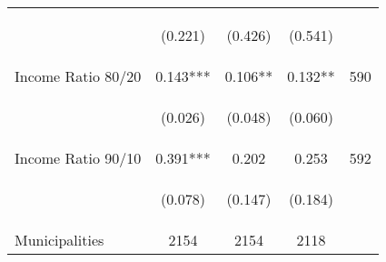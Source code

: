 \begin{tabular}{lcccc}
\vspace{4pt} &  \begin{footnotesize}(0.221)\end{footnotesize}   &
			    \begin{footnotesize}(0.426)\end{footnotesize}   &
			    \begin{footnotesize}(0.541)\end{footnotesize}   &
			     \\          


Income Ratio 80/20     &  0.143***    &    0.106**   &     0.132**  &  590  \\

\vspace{4pt} &  \begin{footnotesize}(0.026)\end{footnotesize}   &
			    \begin{footnotesize}(0.048)\end{footnotesize}   &
			    \begin{footnotesize}(0.060)\end{footnotesize}   &
			     \\


Income Ratio 90/10     &  0.391***    &    0.202   &     0.253  &  592 \\

\vspace{4pt} &  \begin{footnotesize}(0.078)\end{footnotesize}   &
			    \begin{footnotesize}(0.147)\end{footnotesize}   &
			    \begin{footnotesize}(0.184)\end{footnotesize}   &
			     \\

Municipalities   &   2154   &    2154     &  2118    \\
\hline	



\end{tabular}%
